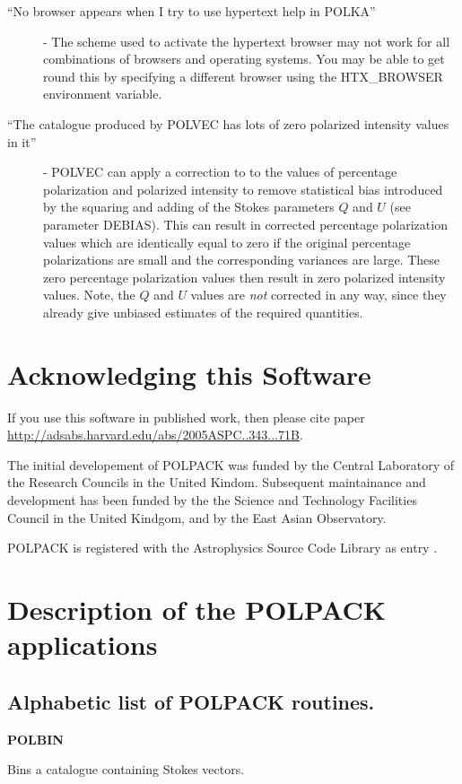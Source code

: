 \documentclass[twoside,11pt]{starlink}
\providecommand{\quickdes}[3]{
                         \parbox{1.1in}{\textbf{#1}}
                         \parbox{4.4in}{\raggedright #2 \dotfill}
                         \parbox{0.6in}{\pageref{#3}}
                         \vspace*{0.2in}}
\begin{document}
\begin{description}
\item [``No browser appears when I try to use hypertext help in POLKA''] -
The scheme used to activate the hypertext browser may not work for all
combinations of browsers and operating systems. You may be able to get
round this by specifying a different browser using the HTX\_BROWSER
environment variable.

\item [``The catalogue produced by POLVEC has lots of zero polarized
intensity values in it''] - POLVEC can apply a correction to to the values
of percentage polarization and polarized intensity to remove statistical
bias introduced by the squaring and adding of the Stokes parameters $Q$ and
$U$ (see  parameter DEBIAS). This can result in
corrected percentage polarization values which are identically equal to zero
if the original percentage polarizations are small and the corresponding
variances are large. These zero percentage polarization values then result in
zero polarized intensity values. Note, the $Q$ and $U$ values are
\emph{not} corrected in any way, since they already give unbiased
estimates of the required quantities.

\end{description}

\section{Acknowledging this Software}
If you use this software in published work, then please cite paper
\url{http://adsabs.harvard.edu/abs/2005ASPC..343...71B}.

The initial developement of POLPACK was funded by the Central Laboratory of the
Research Councils in the United Kindom. Subsequent maintainance and
development has been funded by the the Science and Technology
Facilities Council in the United Kindgom, and by the East Asian
Observatory.

POLPACK is registered with the Astrophysics Source Code Library as entry
.

\newpage
\appendix
\section{ \label{APP:DESCRIPTION}Description of the POLPACK applications}

\subsection{Alphabetic list of POLPACK routines.}
%
%
\quickdes{POLBIN}{Bins a catalogue containing Stokes vectors.}{POLBIN}
\end{document}

